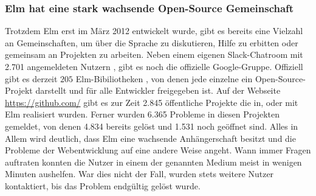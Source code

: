 \subsubsection{Elm hat eine stark wachsende Open-Source Gemeinschaft}
Trotzdem Elm erst im März 2012 entwickelt wurde, gibt es bereits eine Vielzahl an Gemeinschaften, um über die Sprache zu diskutieren, Hilfe zu erbitten oder gemeinsam an Projekten zu arbeiten. Neben einem eigenen Slack-Chatroom mit 2.701 angemeldeten Nutzern \cite[vgl.]{slack-user}, gibt es noch die offizielle Google-Gruppe. Offiziell gibt es derzeit $205$ Elm-Bibiliotheken \cite[vgl.]{elm-package}, von denen jede einzelne ein Open-Source-Projekt darstellt und für alle Entwickler freigegeben ist. Auf der Webseite \url{https://github.com/} gibt es zur Zeit 2.845 öffentliche Projekte \cite[vgl.]{elm-repositories} die in, oder mit Elm realisiert wurden. Ferner wurden 6.365 Probleme in diesen Projekten gemeldet, von denen 4.834 bereits gelöst und 1.531 noch geöffnet sind.  Alles in Allem wird deutlich, dass Elm eine wachsende Anhängerschaft besitzt und die Probleme der Webentwicklung auf eine andere Weise angeht. Wann immer Fragen auftraten konnten die Nutzer in einem der genannten Medium meist in wenigen Minuten aushelfen. War dies nicht der Fall, wurden stets weitere Nutzer kontaktiert, bis das Problem endgültig gelöst wurde.



